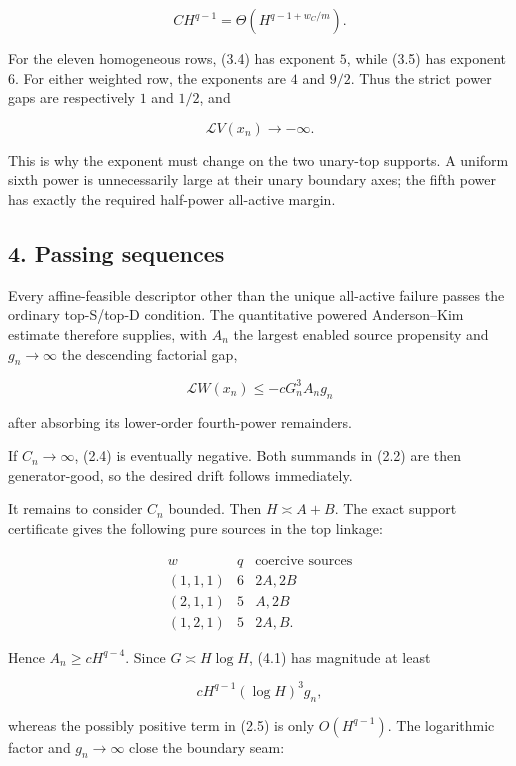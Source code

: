 \[
 CH^{q-1}=\Theta(H^{q-1+w_C/m}).                     \tag{3.5}
\]

For the eleven homogeneous rows, (3.4) has exponent \(5\), while (3.5)
has exponent \(6\). For either weighted row, the exponents are \(4\) and
\(9/2\). Thus the strict power gaps are respectively \(1\) and \(1/2\),
and

\[
             \mathcal LV(x_n)\longrightarrow-\infty. \tag{3.6}
\]

This is why the exponent must change on the two unary-top supports. A
uniform sixth power is unnecessarily large at their unary boundary axes;
the fifth power has exactly the required half-power all-active margin.

\subsection{4. Passing sequences}

Every affine-feasible descriptor other than the unique all-active
failure passes the ordinary top-S/top-D condition. The quantitative
powered Anderson--Kim estimate therefore supplies, with \(A_n\) the
largest enabled source propensity and \(g_n\to\infty\) the descending
factorial gap,

\[
 \mathcal LW(x_n)\le-cG_n^3A_ng_n                  \tag{4.1}
\]

after absorbing its lower-order fourth-power remainders.

If \(C_n\to\infty\), (2.4) is eventually negative. Both summands in
(2.2) are then generator-good, so the desired drift follows immediately.

It remains to consider \(C_n\) bounded. Then \(H\asymp A+B\). The exact
support certificate gives the following pure sources in the top linkage:

\[
\begin{array}{c|c|c}
w&q&\text{coercive sources}\\ \hline
(1,1,1)&6&2A,2B\\
(2,1,1)&5&A,2B\\
(1,2,1)&5&2A,B.
\end{array}                                          \tag{4.2}
\]

Hence \(A_n\ge cH^{q-4}\). Since \(G\asymp H\log H\), (4.1) has
magnitude at least

\[
 cH^{q-1}(\log H)^3g_n,                              \tag{4.3}
\]

whereas the possibly positive term in (2.5) is only \(O(H^{q-1})\). The
logarithmic factor and \(g_n\to\infty\) close the boundary seam:

